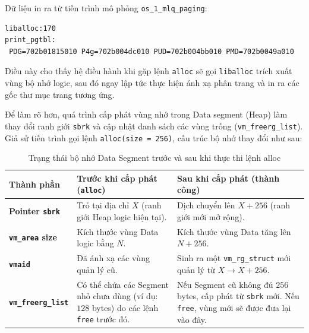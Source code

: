 \documentclass[a4paper]{article}
\begin{document}
Dữ liệu in ra từ tiến trình mô phỏng \texttt{os\_1\_mlq\_paging}:

\begin{verbatim}
liballoc:170
print_pgtbl:
 PDG=702b01815010 P4g=702b004dc010 PUD=702b004bb010 PMD=702b0049a010
\end{verbatim}

Điều này cho thấy hệ điều hành khi gặp lệnh \texttt{alloc} sẽ gọi \texttt{liballoc} trích xuất vùng bộ nhớ logic, sau đó ngay lập tức thực hiện ánh xạ phân trang và in ra các gốc thư mục trang tương ứng.

Để làm rõ hơn, quá trình cấp phát vùng nhớ trong Data segment (Heap) làm thay đổi ranh giới \texttt{sbrk} và cập nhật danh sách các vùng trống (\texttt{vm\_freerg\_list}). Giả sử tiến trình gọi lệnh \texttt{alloc(size = 256)}, cấu trúc bộ nhớ thay đổi như sau:

\begin{table}[H]
    \centering
    \begin{tabularx}{\textwidth}{|l|X|X|}
        \hline
        \textbf{Thành phần}                & \textbf{Trước khi cấp phát (\texttt{alloc})}                                                   & \textbf{Sau khi cấp phát (thành công)}                                                                                   \\ \hline
        \textbf{Pointer \texttt{sbrk}}     & Trỏ tại địa chỉ $X$ (ranh giới Heap logic hiện tại).                                           & Dịch chuyển lên $X + 256$ (ranh giới mới mở rộng).                                                                       \\ \hline
        \textbf{\texttt{vm\_area} size}    & Kích thước vùng Data logic bằng $N$.                                                           & Kích thước vùng Data tăng lên $N + 256$.                                                                                 \\ \hline
        \textbf{\texttt{vmaid}}            & Đã ánh xạ các vùng quản lý cũ.                                                                 & Sinh ra một \texttt{vm\_rg\_struct} mới quản lý từ $X \rightarrow X+256$.                                                \\ \hline
        \textbf{\texttt{vm\_freerg\_list}} & Có thể chứa các Segment nhỏ chưa dùng (ví dụ: $128$ bytes) do các lệnh \texttt{free} trước đó. & Nếu Segment cũ không đủ $256$ bytes, cấp phát từ \texttt{sbrk} mới. Nếu \texttt{free}, vùng mới sẽ được đưa lại vào đây. \\ \hline
    \end{tabularx}

    \caption{Trạng thái bộ nhớ Data Segment trước và sau khi thực thi lệnh alloc}
\end{table}
\end{document}
